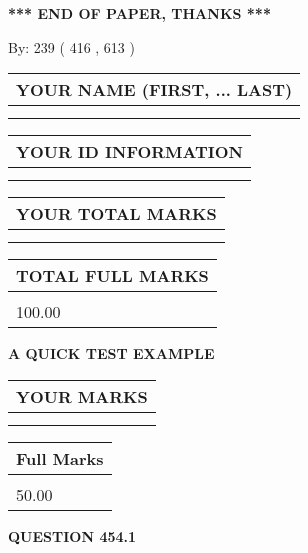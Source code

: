 \documentclass[12pt]{article}
\begin{document}
\vspace{1.0in} 
{\textbf{\large{ *** END OF PAPER, THANKS *** }}} 
   
   
\hspace{1.0in} By: 
 239 ( 416 ,  613 )
   
   
   
   
\newpage 
\setcounter{page}{ 
   454001 } 
   
   
   
   
\noindent\begin{tabular}{|l|}
\hline
YOUR NAME (FIRST, ... LAST)  \\
\hline
 \\ 
 \\ 
\hline
\end{tabular}
\hspace{0.05in} \begin{tabular}{|l|}
\hline
 YOUR   ID   INFORMATION  \\
\hline
 \\ 
 \\ 
\hline
\end{tabular}
   
   
\vspace{0.2in}\noindent\begin{tabular}{|l|}
\hline
YOUR TOTAL MARKS  \\
\hline
 \\ 
 \\ 
\hline
\end{tabular}
\hspace{0.05in} \begin{tabular}{|l|}
\hline
TOTAL FULL MARKS  \\
\hline
 \\ 
100.00 \\
\hline
\end{tabular}
   
   
 \vspace{0.2in}
{\LARGE {\textbf{ A QUICK TEST EXAMPLE}}}
   
   
  
\vspace{0.2in}
  
\noindent\begin{tabular}{|l|}
\hline
 YOUR MARKS  \\
\hline
 \\ 
 \\ 
\hline
\end{tabular}
\hspace{0.05in} \begin{tabular}{|l|}
\hline
 Full Marks  \\
\hline
 \\ 
50.00 \\
\hline
\end{tabular}
{\textbf{\Large{QUESTION
454.1 
}}}
  
\end{document}
